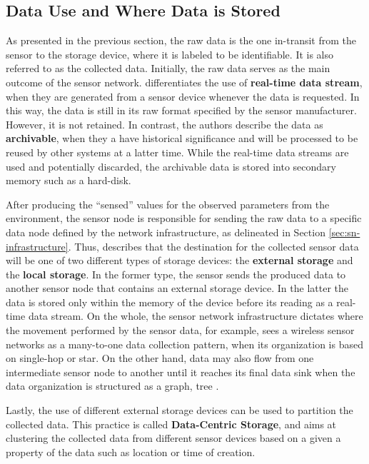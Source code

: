 \subsection{Data Use and Where Data is Stored}
\label{sec:sn-data-purpose}
\label{sec:sn-storage-locations}

As presented in the previous section, the raw data is the one in-transit from
the sensor to the storage device, where it is labeled to be
identifiable. It is also referred to as the collected data. 
Initially, the raw data serves as the main outcome of the sensor network.
\cite{sn-provenance} differentiates the use of \textbf{real-time data stream}, when they are generated from a sensor
device whenever the data is requested. In this way, the data is still in its raw
format specified by the sensor manufacturer. However, it is not retained. 
In contrast, the authors describe the data as \textbf{archivable}, when they a
have historical significance and will be processed to be reused by other systems at
a latter time. While the real-time data streams are used and potentially
discarded, the archivable data is stored into secondary memory such as a
hard-disk.

After producing the ``sensed'' values for the observed parameters from the
environment, the sensor node is responsible for sending the raw data to a specific
data node defined by the network infrastructure, as delineated in Section
\ref{sec:sn-infrastructure}. Thus, \cite{sn-data-centric-storage}
describes that the destination for the collected sensor data will be one of two
different types of storage devices: the \textbf{external storage} and the
\textbf{local storage}. In the former type, the sensor sends the
produced data to another sensor node that contains an external storage device.
In the latter the data is stored only within the memory of the device before its 
reading as a real-time data stream. On the whole, the sensor network
infrastructure dictates where the movement performed by the sensor data,
for example, \cite{sn-storage02} sees a wireless sensor networks as a many-to-one data
collection pattern, when its organization is based on single-hop or star. On
the other hand, data may also flow from one intermediate sensor node to another
until it reaches its final data sink when the data organization is structured
as a graph, tree \cite{sn-storage01, sn-data-centric-storage}.

Lastly, the use of different external storage devices can be used
to partition the collected data. This practice is called \textbf{Data-Centric
Storage}, and aims at clustering the collected data from different sensor
devices based on a given a property of the data such as location or time of
creation.


